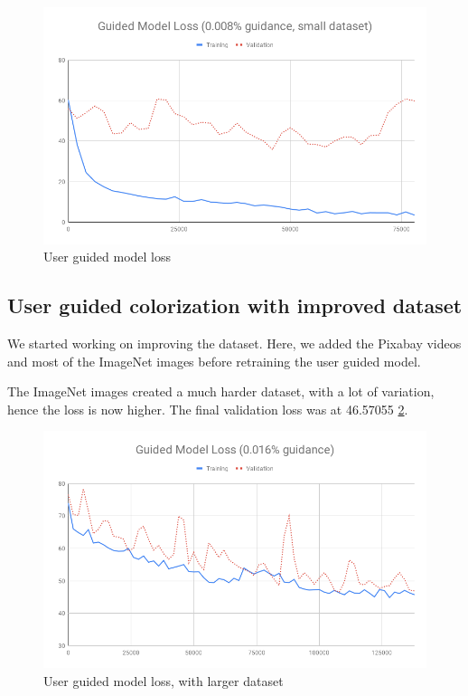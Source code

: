 \documentclass[12pt,openright,twoside,a4paper,english]{abntex2}
\begin{document}
\begin{otherlanguage}{english}
\begin{figure}[!htb]
\centering
\includegraphics[width=\textwidth]{loss/Guided_0_008}
\caption{User guided model loss}
\label{loss_0_008}
\end{figure}

\subsection{User guided colorization with improved dataset}

We started working on improving the dataset. Here, we added the Pixabay videos and most of the ImageNet images before retraining the user guided model.

The ImageNet images created a much harder dataset, with a lot of variation, hence the loss is now higher. The final validation loss was at 46.57055 \ref{loss_0_016}.

\begin{figure}[!htb]
\centering
\includegraphics[width=\textwidth]{loss/Guided_0_016}
\caption{User guided model loss, with larger dataset}
\label{loss_0_016}
\end{figure}


\end{otherlanguage}
\end{document}
